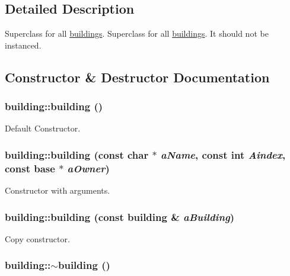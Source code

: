 \subsection{Detailed Description}
Superclass for all \hyperlink{classbuildings}{buildings}. Superclass for all \hyperlink{classbuildings}{buildings}. It should not be instanced. 

\subsection{Constructor \& Destructor Documentation}
\hypertarget{classbuilding_ad342a61b9663079befc52c7100929d96}{
\subsubsection[{building}]{\setlength{\rightskip}{0pt plus 5cm}building::building ()}}
\label{classbuilding_ad342a61b9663079befc52c7100929d96}


Default Constructor. \hypertarget{classbuilding_aa73aea14fd1e7e2952f760fe84f098c3}{
\subsubsection[{building}]{\setlength{\rightskip}{0pt plus 5cm}building::building (const char $\ast$ {\em aName}, \/  const int {\em Aindex}, \/  const {\bf base} $\ast$ {\em aOwner})}}
\label{classbuilding_aa73aea14fd1e7e2952f760fe84f098c3}


Constructor with arguments. \hypertarget{classbuilding_aef43740bc60aed8365e98539fcc3007d}{
\subsubsection[{building}]{\setlength{\rightskip}{0pt plus 5cm}building::building (const {\bf building} \& {\em aBuilding})}}
\label{classbuilding_aef43740bc60aed8365e98539fcc3007d}


Copy constructor. \hypertarget{classbuilding_a95a0fbd3ebfdd2077e7d8588bf7931ee}{
\subsubsection[{$\sim$building}]{\setlength{\rightskip}{0pt plus 5cm}building::$\sim$building ()}}
\label{classbuilding_a95a0fbd3ebfdd2077e7d8588bf7931ee}


